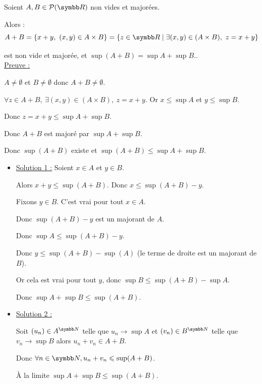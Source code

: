 \begin{exemple}
    Soient $A, B \in \mathcal P(\R)$ non vides et majorées. 

    Alors :
     \[A + B = \{x + y,~(x,y) \in A \times B\} = \{z \in \R \mid \exists (x, y) \in (A \times B),~z = x + y\}\]

    est non vide et majorée, et $\sup( A + B) = \sup A + \sup B$.. \\

    \uline{Preuve :}

    $A \neq \emptyset$ et $B \neq \emptyset$ donc $A + B \neq \emptyset$.

    $\forall z \in A + B,~\exists(x, y) \in (A \times B),~z = x + y$.
    Or $x \leqslant \sup A $ et $y \leqslant \sup B$.

    Donc $z = x + y \leqslant \sup A + \sup B$.

    Donc $A + B$ est majoré par $\sup A + \sup B$.

    Donc $\sup(A+ B)$ existe et $\sup (A + B) \leqslant \sup A + \sup B$.

    \begin{itemize}
        \item \uline{Solution 1 :}
        Soient $x \in A$ et $y \in B$.

        Alors $x + y \leqslant \sup(A + B)$.
        Donc $x \leqslant \sup(A + B) - y$.

        Fixons $y \in B$. C'est vrai pour tout $x \in A$.

        Donc $\sup(A + B) - y$ est un majorant de $A$. 

        Donc $\sup A \leqslant \sup(A + B) - y$.

        Donc $y \leqslant \sup(A + B) - \sup(A)$ (le terme de droite est un majorant de $B$).

        Or cela est vrai pour tout $y$, donc $\sup B \leqslant \sup(A + B) - \sup A$.

        Donc $\sup A + \sup B \leqslant \sup(A + B)$.

        \item \uline{Solution 2 :}

        Soit $(u_n) \in A^{\N}$ telle que $u_n \to \sup A$
        et $(v_n) \in B^{\N}$ telle que $ v_n \to \sup B$
        alors $u_n + v_n \in A + B$. 

        Donc $\forall n \in \N, u_n + v_n \leqslant \sup(A + B)$.
    
        À la limite $\sup A + \sup B \leqslant \sup(A + B)$.
    \end{itemize}
\end{exemple}

